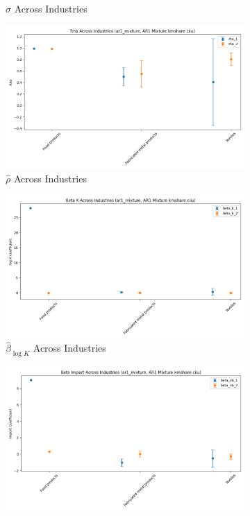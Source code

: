 \documentclass{article}
\begin{document}
\begin{figure}[ht!]
\begin{subfigure}[t]{0.32\textwidth}
        \caption{$\hat\sigma$ Across Industries}
    \end{subfigure}
    \begin{subfigure}[t]{0.32\textwidth}
        \centering
        \includegraphics[width=\textwidth]{figure/ar1_mixture_kmshare_ciiu_rho_across_industries.png}
        \caption{$\hat\rho$ Across Industries}
    \end{subfigure}
    \begin{subfigure}[t]{0.32\textwidth}
        \centering
        \includegraphics[width=\textwidth]{figure/ar1_mixture_kmshare_ciiu_beta_k_across_industries.png}
        \caption{$\hat{\beta}_{\log K}$ Across Industries}
    \end{subfigure}
    \begin{subfigure}[t]{0.32\textwidth}
        \centering
        \includegraphics[width=\textwidth]{figure/ar1_mixture_kmshare_ciiu_beta_im_across_industries.png}

\end{subfigure}
\end{figure}
\end{document}
